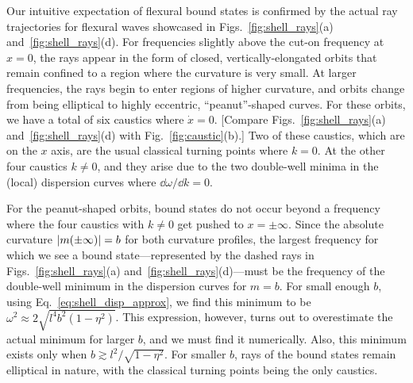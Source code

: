 Our intuitive expectation of flexural bound states is confirmed by the actual ray trajectories for flexural waves showcased in Figs.~\ref{fig:shell_rays}(a) and~\ref{fig:shell_rays}(d).
For frequencies slightly above the cut-on frequency at $x = 0$, the rays appear in the form of closed, vertically-elongated orbits that remain confined to a region where the curvature is very small.
At larger frequencies, the rays begin to enter regions of higher curvature, and orbits change from being elliptical to highly eccentric, ``peanut''-shaped curves.
For these orbits, we have a total of six caustics where $\dot{x} = 0$.
[Compare Figs.~\ref{fig:shell_rays}(a) and~\ref{fig:shell_rays}(d) with Fig.~\ref{fig:caustic}(b).]
Two of these caustics, which are on the $x$ axis, are the usual classical turning points where $k = 0$.
At the other four caustics $k \neq 0$, and they arise due to the two double-well minima in the (local) dispersion curves where $\dd{\omega}/\dd{k} = 0$.

For the peanut-shaped orbits, bound states do not occur beyond a frequency where the four caustics with $k \neq 0$ get pushed to $x = \pm \infty$.
Since the absolute curvature $\lvert m(\pm \infty)\rvert = b$ for both curvature profiles, the largest frequency for which we see a bound state---represented by the dashed rays in Figs.~\ref{fig:shell_rays}(a) and~\ref{fig:shell_rays}(d)---must be the frequency of the double-well minimum in the dispersion curves for $m = b$.
For small enough $b$, using Eq.~\eqref{eq:shell_disp_approx}, we find this minimum to be $\omega^{2} \approx 2\sqrt{l^{4}b^{2}(1-\eta^{2})}$.
This expression, however, turns out to overestimate the actual minimum for larger $b$, and we must find it numerically.
Also, this minimum exists only when $b \gtrsim l^{2}/\sqrt{1-\eta^{2}}$.
For smaller $b$, rays of the bound states remain elliptical in nature, with the classical turning points being the only caustics.

